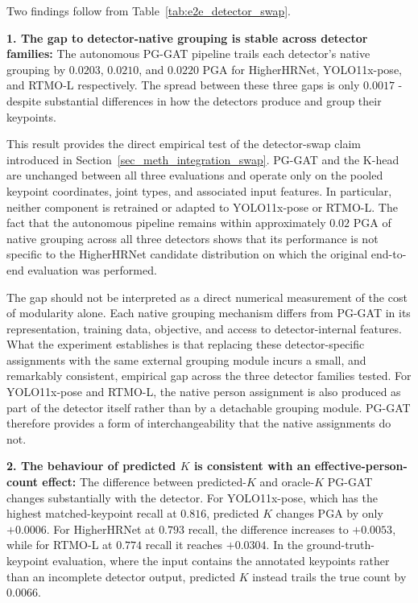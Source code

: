 Two findings follow from Table~\ref{tab:e2e_detector_swap}.

\textbf{1. The gap to detector-native grouping is stable across
detector families:}
The autonomous PG-GAT pipeline trails each detector's native grouping
by $0.0203$,
$0.0210$, and $0.0220$ PGA for HigherHRNet,
YOLO11x-pose, and RTMO-L respectively.
The spread between these three gaps is only $0.0017$ -
despite substantial differences in how the detectors produce and group
their keypoints.

This result provides the direct empirical test of the detector-swap
claim introduced in Section~\ref{sec_meth_integration_swap}.
PG-GAT and the K-head are unchanged between all three evaluations
and operate only on the pooled keypoint coordinates,
joint types,
and associated input features.
In particular, neither component is retrained or adapted to
YOLO11x-pose or RTMO-L.
The fact that the autonomous pipeline remains within approximately
$0.02$ PGA of native grouping across all three detectors shows that
its performance is not specific to the HigherHRNet candidate
distribution on which the original end-to-end evaluation was performed.

The gap should not be interpreted as a direct numerical measurement
of the cost of modularity alone.
Each native grouping mechanism differs from PG-GAT in its representation,
training data,
objective,
and access to detector-internal features.
What the experiment establishes is that replacing these detector-specific
assignments with the same external grouping module incurs a small,
and remarkably consistent, empirical gap across the three detector
families tested.
For YOLO11x-pose and RTMO-L, the native person assignment is also
produced as part of the detector itself rather than by a detachable
grouping module.
PG-GAT therefore provides a form of interchangeability that the native
assignments do not.

\textbf{2. The behaviour of predicted $K$ is consistent with an
effective-person-count effect:}
The difference between predicted-$K$ and oracle-$K$ PG-GAT changes
substantially with the detector.
For YOLO11x-pose, which has the highest matched-keypoint recall
at $0.816$, predicted $K$ changes PGA by only $+0.0006$.
For HigherHRNet at $0.793$ recall, the difference increases to
$+0.0053$, while for RTMO-L at $0.774$ recall it reaches $+0.0304$.
In the ground-truth-keypoint evaluation, where the input contains
the annotated keypoints rather than an incomplete detector output,
predicted $K$ instead trails the true count by $0.0066$.

